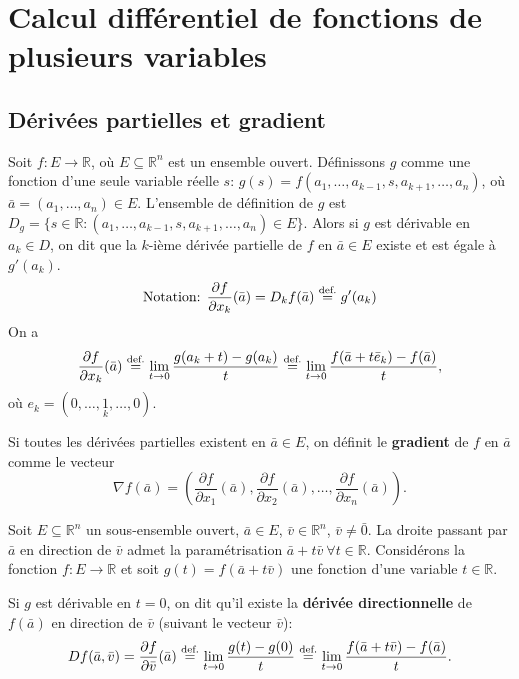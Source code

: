 \documentclass{report}
\newcommand*\eqdef{\; \stackrel{ \mathclap{ \normalfont\text{def.} } }{ = } \;} %
\begin{document}
\chapter{Calcul différentiel de fonctions de plusieurs variables}

\section{Dérivées partielles et gradient}

\begin{defn}
	Soit $f : E \to \mathbb R$, où $E \subseteq \mathbb R^n$ est un ensemble ouvert. Définissons $g$ comme une fonction d'une seule variable réelle $s$: $g(s) = f(a_1, \ldots, a_{k-1}, s, a_{k+1}, \ldots, a_n)$, où $\bar a = (a_1, \ldots, a_n) \in E$. L'ensemble de définition de $g$ est $D_g = \{s \in \mathbb R : (a_1, \ldots, a_{k-1}, s, a_{k+1}, \ldots, a_n) \in E\}$. Alors si $g$ est dérivable en $a_k \in D$, on dit que la $k$-ième dérivée partielle de $f$ en $\bar a \in E$ existe et est égale à $g'(a_k)$.
	\begin{equation}
		\text{Notation: } \frac{\partial f}{\partial x_k}(\bar a) = D_k f(\bar a) \eqdef g'(a_k)
	\end{equation}
	On a
	\begin{equation}
		\frac{\partial f}{\partial x_k}(\bar a) \eqdef \lim_{t \to 0} \frac{g(a_k + t) - g(a_k)}{t} \eqdef \lim_{t \to 0} \frac{f(\bar a + t \bar e_k) - f(\bar a)}{t},
	\end{equation}
	où $e_k = (0, \ldots, \underset{k}{1}, \ldots, 0)$.
\end{defn}

\begin{defn}
	Si toutes les dérivées partielles existent en $\bar a \in E$, on définit le \textbf{gradient} de $f$ en $\bar a$ comme le vecteur
	\begin{equation}
		\nabla f(\bar a) = \left( \frac{\partial f}{\partial x_1}(\bar a), \frac{\partial f}{\partial x_2}(\bar a), \ldots, \frac{\partial f}{\partial x_n}(\bar a) \right).
	\end{equation}
\end{defn}

\begin{defn}
	Soit $E \subseteq \mathbb R^n$ un sous-ensemble ouvert, $\bar a \in E$, $\bar v \in \mathbb R^n$, $\bar v \neq \bar 0$. La droite passant par $\bar a$ en direction de $\bar v$ admet la paramétrisation $\bar a + t\bar v \ \forall t \in \mathbb R$. Considérons la fonction $f : E \to \mathbb R$ et soit $g(t) = f(\bar a + t\bar v)$ une fonction d'une variable $t \in \mathbb R$. \par
	Si $g$ est dérivable en $t = 0$, on dit qu'il existe la \textbf{dérivée directionnelle} de $f(\bar a)$ en direction de $\bar v$ (suivant le vecteur $\bar v$):
	\begin{equation}
		D f(\bar a, \bar v) = \frac{\partial f}{\partial \bar v}(\bar a) \eqdef \lim_{t \to 0} \frac{g(t) - g(0)}{t} \eqdef \lim_{t \to 0} \frac{f(\bar a + t\bar v) - f(\bar a)}{t}.
	\end{equation}
\end{defn}
\end{document}
